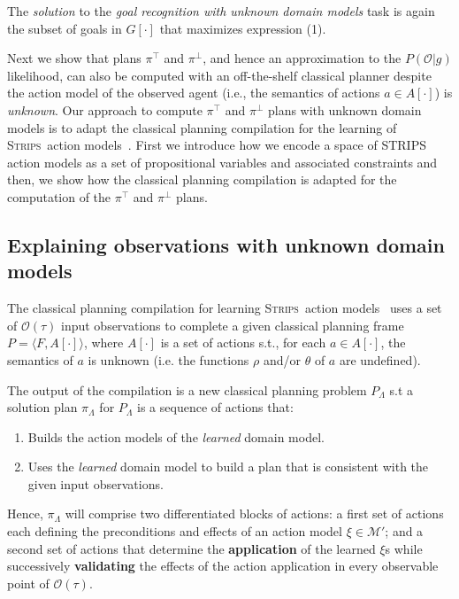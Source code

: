 \documentclass{article}
\newcommand{\tup}[1]{{\langle #1 \rangle}}
\newcommand{\strips}{\textsc{Strips}}
\begin{document}
The {\em solution} to the {\em goal recognition with unknown domain models} task is again the subset of goals in $G[\cdot]$ that maximizes expression (1). 

Next we show that plans $\pi^\top$ and $\pi^\bot$, and hence an approximation to the $P(\mathcal{O}|g)$ likelihood, can also be computed with an off-the-shelf classical planner despite the action model of the observed agent (i.e., the semantics of actions $a\in A[\cdot]$) is {\em unknown}. Our approach to compute $\pi^\top$ and $\pi^\bot$ plans with unknown domain models is to adapt the classical planning compilation for the learning of \strips\ action models~\cite{aineto2018learning}. First we introduce how we encode a space of STRIPS action models as a set of propositional variables and associated constraints and then, we show how the classical planning compilation is adapted for the computation of the $\pi^\top$ and $\pi^\bot$ plans.


\subsection{Explaining observations with unknown domain models}
The classical planning compilation for learning \strips\ action models~\cite{aineto2018learning} uses a set of $\mathcal{O}(\tau)$ input observations to complete a given classical planning frame $P=\tup{F,A[\cdot]}$, where $A[\cdot]$ is a set of actions s.t., for each $a\in A[\cdot]$, the semantics of $a$ is unknown (i.e. the functions $\rho$ and/or $\theta$ of $a$ are undefined).

The output of the compilation is a new classical planning problem $P_\Lambda$ s.t a solution plan $\pi_\Lambda$ for $P_\Lambda$ is a sequence of actions that:
\begin{enumerate}
\item Builds the action models of the {\em learned} domain model. 
\item Uses the {\em learned} domain model to build a plan that is consistent with the given input observations.
\end{enumerate}
Hence, $\pi_\Lambda$ will comprise two differentiated blocks of actions: a first set of actions each defining the preconditions and effects of an action model $\xi \in \mathcal{M'}$; and a second set of actions that determine the \textbf{application} of the learned $\xi$s while successively \textbf{validating} the effects of the action application in every observable point of $\mathcal{O}(\tau)$.
\end{document}
